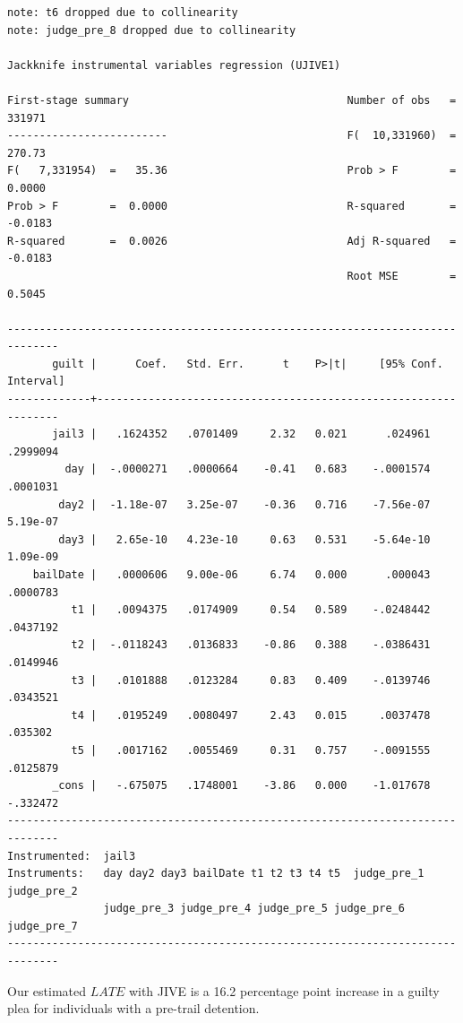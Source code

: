 \documentclass[
]{book}
\newenvironment{Shaded}{\begin{snugshade}}{\end{snugshade}}
\newcommand{\KeywordTok}[1]{\textcolor[rgb]{0.13,0.29,0.53}{\textbf{#1}}}
\newcommand{\NormalTok}[1]{#1}
\newcommand{\OtherTok}[1]{\textcolor[rgb]{0.56,0.35,0.01}{#1}}
\begin{document}
\begin{verbatim}
note: t6 dropped due to collinearity
note: judge_pre_8 dropped due to collinearity

Jackknife instrumental variables regression (UJIVE1)

First-stage summary                                  Number of obs   =  331971
-------------------------                            F(  10,331960)  =  270.73
F(   7,331954)  =   35.36                            Prob > F        =  0.0000
Prob > F        =  0.0000                            R-squared       = -0.0183
R-squared       =  0.0026                            Adj R-squared   = -0.0183
                                                     Root MSE        =  0.5045

------------------------------------------------------------------------------
       guilt |      Coef.   Std. Err.      t    P>|t|     [95% Conf. Interval]
-------------+----------------------------------------------------------------
       jail3 |   .1624352   .0701409     2.32   0.021      .024961    .2999094
         day |  -.0000271   .0000664    -0.41   0.683    -.0001574    .0001031
        day2 |  -1.18e-07   3.25e-07    -0.36   0.716    -7.56e-07    5.19e-07
        day3 |   2.65e-10   4.23e-10     0.63   0.531    -5.64e-10    1.09e-09
    bailDate |   .0000606   9.00e-06     6.74   0.000      .000043    .0000783
          t1 |   .0094375   .0174909     0.54   0.589    -.0248442    .0437192
          t2 |  -.0118243   .0136833    -0.86   0.388    -.0386431    .0149946
          t3 |   .0101888   .0123284     0.83   0.409    -.0139746    .0343521
          t4 |   .0195249   .0080497     2.43   0.015     .0037478     .035302
          t5 |   .0017162   .0055469     0.31   0.757    -.0091555    .0125879
       _cons |   -.675075   .1748001    -3.86   0.000    -1.017678    -.332472
------------------------------------------------------------------------------
Instrumented:  jail3
Instruments:   day day2 day3 bailDate t1 t2 t3 t4 t5  judge_pre_1 judge_pre_2
               judge_pre_3 judge_pre_4 judge_pre_5 judge_pre_6 judge_pre_7
------------------------------------------------------------------------------
\end{verbatim}

Our estimated \(LATE\) with JIVE is a 16.2 percentage point increase in a guilty plea for individuals with a pre-trail detention.

\begin{Shaded}
\end{Shaded}
\end{document}
